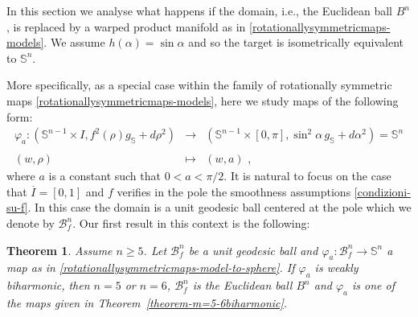 \documentclass[11pt]{amsart}
\theoremstyle{plain}
\newtheorem{theorem}                {Theorem}      [section]
\theoremstyle{definition}
\numberwithin{equation}{section}
\def \s{{\mathbb S}}
\numberwithin{equation}{section}
\begin{document}
In this section we analyse what happens if the domain, i.e., the Euclidean ball $B^n$, is replaced by a warped product manifold as in \eqref{rotationallysymmetricmaps-models}. We assume $h(\alpha)=\sin \alpha$ and so the target is isometrically equivalent to $\s^n$. 

More specifically, as a special case within the family of rotationally symmetric maps \eqref{rotationallysymmetricmaps-models}, here we study maps of the following form:
{\small
\begin{equation}\label{rotationallysymmetricmaps-model-to-sphere}
\begin{array}{rll}
                                           \varphi_{a} \colon\left (\s^{n-1} \times I, f^2(\rho)g_{\s}+d\rho^2 \right ) &\to &  \left (\s^{n-1} \times [0,\pi], \sin^2\!\alpha\, g_{\s}+d\alpha^2 \right )=\s^n \\
                                           && \\
                                           (w,\rho)& \mapsto & (w,a) \,\, , 
                                         \end{array}
\end{equation}
}
where $a$ is a constant such that $0<a<\pi/2$. It is natural to focus on the case that $\overline{I}=[0,1]$ and $f$ verifies in the pole the smoothness assumptions \eqref{condizioni-su-f}. In this case the domain is a unit geodesic ball centered at the pole which we denote by $\mathcal{B}^n_f$.
Our first result in this context is the following:
\begin{theorem}\label{th-model-non-existence}
Assume $n \geq 5$. Let $\mathcal{B}^n_f$ be a unit geodesic ball and $\varphi_a:\mathcal{B}^n_f \to \s^n$ a map as in \eqref{rotationallysymmetricmaps-model-to-sphere}. 
If $\varphi_a$ is weakly biharmonic, then $n=5$ or $n=6$, $\mathcal{B}^n_f$ is the Euclidean ball $B^n$ and $\varphi_a$ is one of the maps given in Theorem~\ref{theorem-m=5-6biharmonic}.
\end{theorem}
\end{document}
